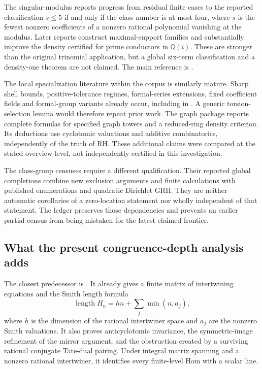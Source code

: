 The singular-modulus reports progress from residual finite cases to the
reported classification $s\le5$ if and only if the class number is at most
four, where $s$ is the fewest nonzero coefficients of a nonzero rational polynomial
vanishing at the modulus. Later reports construct maximal-support families
and substantially improve the density certified for prime conductors in
$\mathbb Q(i)$. These are stronger than the original trinomial application,
but a global six-term classification and a density-one theorem are not
claimed. The main reference is
.\cite{priorsparse,priorinventory}

The local specialization literature within the corpus is similarly mature.
Sharp shell bounds, positive-tolerance regimes, formal-series extensions,
fixed coefficient fields and formal-group variants already occur, including
in .
A generic torsion-selection lemma would therefore repeat prior work.
The graph package
reports complete formulas for specified graph towers and a reduced-ring
density criterion. Its deductions use cyclotomic valuations and additive
combinatorics, independently of the truth of RH.
These additional claims were compared at the stated overview level,
not independently certified in this investigation.\cite{priortorsion,priorgraphs}

The class-group censuses require a different qualification. Their reported
global completions combine new exclusion arguments and finite calculations
with published enumerations and quadratic Dirichlet GRH. They are neither
automatic corollaries of a zero-location statement nor wholly independent
of that statement. The ledger preserves those dependencies and prevents
an earlier partial census from being mistaken for the latest claimed
frontier.\cite{priorinventory}

\subsection{What the present congruence-depth analysis adds}

The closest predecessor is
.
It already gives a finite matrix of intertwining equations and the Smith
length formula
\[
 \operatorname{length}H_n=hn+\sum_j\min(n,a_j),
\]
where $h$ is the dimension of the rational intertwiner space and $a_j$
are the nonzero Smith valuations. It also proves anticyclotomic invariance,
the symmetric-image refinement of the mirror argument, and the obstruction
created by a surviving rational conjugate Tate-dual pairing.
Under integral matrix spanning and a nonzero rational intertwiner, it
identifies every finite-level Hom with a scalar line.\cite{priorstruct}

